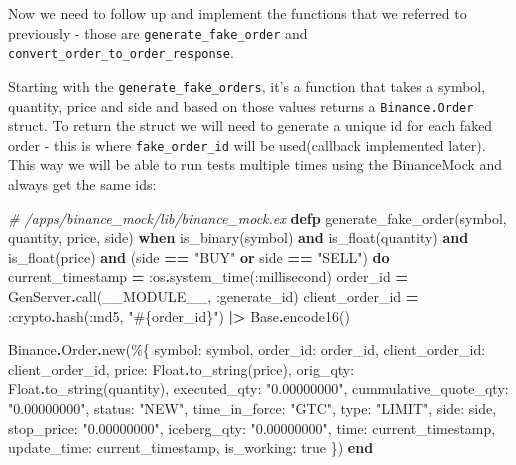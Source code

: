 \documentclass[
]{book}
\newenvironment{Shaded}{\begin{snugshade}}{\end{snugshade}}
\newcommand{\CommentTok}[1]{\textcolor[rgb]{0.56,0.35,0.01}{\textit{#1}}}
\newcommand{\ConstantTok}[1]{\textcolor[rgb]{0.00,0.00,0.00}{#1}}
\newcommand{\KeywordTok}[1]{\textcolor[rgb]{0.13,0.29,0.53}{\textbf{#1}}}
\newcommand{\NormalTok}[1]{#1}
\newcommand{\OperatorTok}[1]{\textcolor[rgb]{0.81,0.36,0.00}{\textbf{#1}}}
\newcommand{\OtherTok}[1]{\textcolor[rgb]{0.56,0.35,0.01}{#1}}
\newcommand{\StringTok}[1]{\textcolor[rgb]{0.31,0.60,0.02}{#1}}
\newcommand{\VariableTok}[1]{\textcolor[rgb]{0.00,0.00,0.00}{#1}}
\begin{document}
Now we need to follow up and implement the functions that we referred to
previously - those are \texttt{generate\_fake\_order} and \texttt{convert\_order\_to\_order\_response}.

Starting with the \texttt{generate\_fake\_orders}, it's a function that takes a symbol, quantity, price and side and based on those values returns a \texttt{Binance.Order} struct. To return the struct we will need to generate a unique id for each faked order - this is where \texttt{fake\_order\_id} will be used(callback implemented later). This way we will be able to run tests multiple times using the BinanceMock and always get the same ids:

\begin{Shaded}
\begin{Highlighting}[]
\CommentTok{\# /apps/binance\_mock/lib/binance\_mock.ex}
  \KeywordTok{defp}\NormalTok{ generate\_fake\_order(symbol, quantity, price, side)}
       \KeywordTok{when}\NormalTok{ is\_binary(symbol) }\KeywordTok{and}
\NormalTok{              is\_float(quantity) }\KeywordTok{and}
\NormalTok{              is\_float(price) }\KeywordTok{and}
\NormalTok{              (side }\OperatorTok{==} \StringTok{"BUY"} \KeywordTok{or}\NormalTok{ side }\OperatorTok{==} \StringTok{"SELL"}\NormalTok{) }\KeywordTok{do}
\NormalTok{    current\_timestamp }\OperatorTok{=} \VariableTok{:os}\OperatorTok{.}\NormalTok{system\_time(}\VariableTok{:millisecond}\NormalTok{)}
\NormalTok{    order\_id }\OperatorTok{=} \ConstantTok{GenServer}\OperatorTok{.}\NormalTok{call(}\ConstantTok{\_\_MODULE\_\_}\NormalTok{, }\VariableTok{:generate\_id}\NormalTok{)}
\NormalTok{    client\_order\_id }\OperatorTok{=} \VariableTok{:crypto}\OperatorTok{.}\NormalTok{hash(}\VariableTok{:md5}\NormalTok{, }\StringTok{"}\OtherTok{\#\{}\NormalTok{order\_id}\OtherTok{\}}\StringTok{"}\NormalTok{) }\OperatorTok{|\textgreater{}} \ConstantTok{Base}\OperatorTok{.}\NormalTok{encode16()}

    \ConstantTok{Binance}\OperatorTok{.}\ConstantTok{Order}\OperatorTok{.}\NormalTok{new(\%\{}
      \VariableTok{symbol:}\NormalTok{ symbol,}
      \VariableTok{order\_id:}\NormalTok{ order\_id,}
      \VariableTok{client\_order\_id:}\NormalTok{ client\_order\_id,}
      \VariableTok{price:} \ConstantTok{Float}\OperatorTok{.}\NormalTok{to\_string(price),}
      \VariableTok{orig\_qty:} \ConstantTok{Float}\OperatorTok{.}\NormalTok{to\_string(quantity),}
      \VariableTok{executed\_qty:} \StringTok{"0.00000000"}\NormalTok{,}
      \VariableTok{cummulative\_quote\_qty:} \StringTok{"0.00000000"}\NormalTok{,}
      \VariableTok{status:} \StringTok{"NEW"}\NormalTok{,}
      \VariableTok{time\_in\_force:} \StringTok{"GTC"}\NormalTok{,}
      \VariableTok{type:} \StringTok{"LIMIT"}\NormalTok{,}
      \VariableTok{side:}\NormalTok{ side,}
      \VariableTok{stop\_price:} \StringTok{"0.00000000"}\NormalTok{,}
      \VariableTok{iceberg\_qty:} \StringTok{"0.00000000"}\NormalTok{,}
      \VariableTok{time:}\NormalTok{ current\_timestamp,}
      \VariableTok{update\_time:}\NormalTok{ current\_timestamp,}
      \VariableTok{is\_working:} \ConstantTok{true}
\NormalTok{    \})}
  \KeywordTok{end}
\end{Highlighting}
\end{Shaded}
\end{document}
